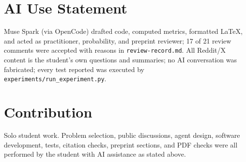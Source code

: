 \documentclass{article}
\begin{document}
\section*{AI Use Statement}
Muse Spark (via OpenCode) drafted code, computed metrics, formatted LaTeX, and acted
as practitioner, probability, and preprint reviewer; 17 of 21 review comments were
accepted with reasons in \texttt{review-record.md}. All Reddit/X content is the
student's own questions and summaries; no AI conversation was fabricated; every test
reported was executed by \texttt{experiments/\allowbreak{}run\_experiment.py}.

\section*{Contribution}
Solo student work. Problem selection, public discussions, agent design, software
development, tests, citation checks, preprint sections, and PDF checks were all
performed by the student with AI assistance as stated above.



\end{document}
